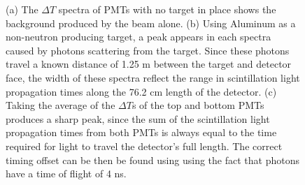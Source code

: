 \begin{figure}[htbp]
\begin{center}

\end{center}

\caption{(a) The $\Delta T $ spectra of PMTs with no target in place  shows the background produced by the beam alone.
(b) Using Aluminum as a non-neutron producing target, a peak appears in each spectra caused by photons scattering from the target.
Since these photons travel a known distance of 1.25 m between the target and detector face, the width of these spectra reflect the range in scintillation light propagation times along the 76.2 cm length of the detector.
(c) Taking the average of the $\Delta T$s of the top and bottom PMTs produces a sharp peak, since the sum of the scintillation light propagation times from both PMTs is always equal to the time required for light to travel the detector's full length.
The correct timing offset can be then be found using using the fact that photons have a time of flight of 4 ns. }
\label{fig:ToFDetermination}
\end{figure}


